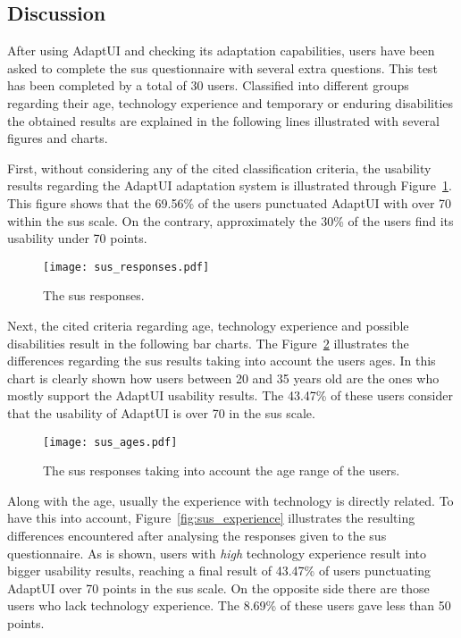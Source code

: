 \subsection{Discussion}
\label{sec:user_evaluation_discussion}

After using AdaptUI and checking its adaptation capabilities, users have been 
asked to complete the \ac{sus} questionnaire with several extra questions. This 
test has been completed by a total of 30 users. Classified into different groups
regarding their age, technology experience and temporary or enduring disabilities 
the obtained results are explained in the following lines illustrated with several 
figures and charts.

First, without considering any of the cited classification criteria, the 
usability results regarding the AdaptUI adaptation system is illustrated through
Figure~\ref{fig:sus_responses}. This figure shows that the 69.56\% of the users
punctuated AdaptUI with over 70 within the \ac{sus} scale. On the contrary, 
approximately the 30\% of the users find its usability under 70 points.

\begin{figure}
\centering
\texttt{[image: sus\_responses.pdf]}
\caption{The \ac{sus} responses.}
\label{fig:sus_responses}
\end{figure}

Next, the cited criteria regarding age, technology experience and possible
disabilities result in the following bar charts. The Figure~\ref{fig:sus_age}
illustrates the differences regarding the \ac{sus} results taking into account the
users ages. In this chart is clearly shown how users between 20 and 35 years old
are the ones who mostly support the AdaptUI usability results. The 43.47\% of
these users consider that the usability of AdaptUI is over 70 in the \ac{sus} scale.

\begin{figure}
\centering
\texttt{[image: sus\_ages.pdf]}
\caption{The \ac{sus} responses taking into account the age range of the users.}
\label{fig:sus_age}
\end{figure}

Along with the age, usually the experience with technology is directly related.
To have this into account, Figure~\ref{fig:sus_experience} illustrates the
resulting differences encountered after analysing the responses given to the \ac{sus}
questionnaire. As is shown, users with \textit{high} technology experience 
result into bigger usability results, reaching a final result of 43.47\% of 
users punctuating AdaptUI over 70 points in the \ac{sus} scale. On the opposite side 
there are those users who lack technology experience. The 8.69\% of these 
users gave less than 50 points. 

